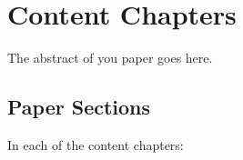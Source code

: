 \renewcommand{\publicationhead}{\flushleft\footnotesize{
    Based on:\\[0.1cm]%
    Author List, 
    (YEAR)
    \textit{``Paper Title,''} 
    in Venue, other fields,
    DOI:99.9999/thedoi.9999\\[0.1cm]
}}

\chapter{Content Chapters}%
\label{c2}

\begin{chapterabstract}
    The abstract of you paper goes here.
\end{chapterabstract}


\section{Paper Sections}%
\label{sec:c2:intro}%

In each of the content chapters:

